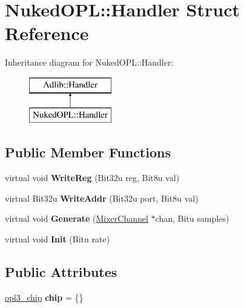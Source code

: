 \hypertarget{structNukedOPL_1_1Handler}{\section{Nuked\-O\-P\-L\-:\-:Handler Struct Reference}
\label{structNukedOPL_1_1Handler}
}
Inheritance diagram for Nuked\-O\-P\-L\-:\-:Handler\-:\begin{figure}[H]
\begin{center}
\leavevmode
\includegraphics[height=2.000000cm]{structNukedOPL_1_1Handler}
\end{center}
\end{figure}
\subsection*{Public Member Functions}
\begin{DoxyCompactItemize}
\item 
\hypertarget{structNukedOPL_1_1Handler_a3eb56c73d0d686f94d3dde610d076701}{virtual void {\bfseries Write\-Reg} (Bit32u reg, Bit8u val)}\label{structNukedOPL_1_1Handler_a3eb56c73d0d686f94d3dde610d076701}

\item 
\hypertarget{structNukedOPL_1_1Handler_a547e26ed696b27870c7c6785d90dfde7}{virtual Bit32u {\bfseries Write\-Addr} (Bit32u port, Bit8u val)}\label{structNukedOPL_1_1Handler_a547e26ed696b27870c7c6785d90dfde7}

\item 
\hypertarget{structNukedOPL_1_1Handler_aa328e6f2071bcb5f65173f3fbe3e2e05}{virtual void {\bfseries Generate} (\hyperlink{classMixerChannel}{Mixer\-Channel} $\ast$chan, Bitu samples)}\label{structNukedOPL_1_1Handler_aa328e6f2071bcb5f65173f3fbe3e2e05}

\item 
\hypertarget{structNukedOPL_1_1Handler_a8d93a0fcd4d17c7f85f5d8a65c0411d0}{virtual void {\bfseries Init} (Bitu rate)}\label{structNukedOPL_1_1Handler_a8d93a0fcd4d17c7f85f5d8a65c0411d0}

\end{DoxyCompactItemize}
\subsection*{Public Attributes}
\begin{DoxyCompactItemize}
\item 
\hypertarget{structNukedOPL_1_1Handler_a9c5310036580811bf25b820f4cc6f5d4}{\hyperlink{structopl3__chip}{opl3\-\_\-chip} {\bfseries chip} = \{\}}\label{structNukedOPL_1_1Handler_a9c5310036580811bf25b820f4cc6f5d4}

\end{DoxyCompactItemize}


